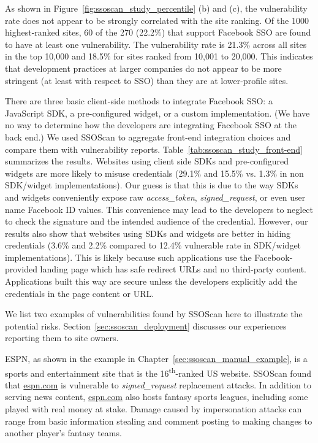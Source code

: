 As shown in Figure~\ref{fig:ssoscan_study_percentile} (b) and (c), the vulnerability rate does not appear to be strongly correlated with the site ranking.  Of the 1000 highest-ranked sites, 60 of the 270 (22.2\%) that support Facebook SSO are found to have at least one vulnerability.  The vulnerability rate is 21.3\% across all sites in the top 10,000 and 18.5\% for sites ranked from 10,001 to 20,000.  This indicates that development practices at larger companies do not appear to be more stringent (at least with respect to SSO) than they are at lower-profile sites.

 There are three basic client-side methods to integrate Facebook SSO: a JavaScript SDK, a pre-configured widget, or a custom implementation.  (We have no way to determine how the developers are integrating Facebook SSO at the back end.)  We used SSOScan to aggregate front-end integration choices and compare them with vulnerability reports.  Table~\ref{tab:ssoscan_study_front-end} summarizes the results.  Websites using client side SDKs and pre-configured widgets are more likely to misuse credentials (29.1\% and 15.5\% vs. 1.3\% in non SDK/widget implementations).  Our guess is that this is due to the way SDKs and widgets conveniently expose raw \emph{access\_token}, \emph{signed\_request}, or even user name Facebook ID values.  This convenience may lead to the developers to neglect to check the signature and the intended audience of the credential.  However, our results also show that websites using SDKs and widgets are better in hiding credentials (3.6\% and 2.2\% compared to 12.4\% vulnerable rate in SDK/widget implementations).  This is likely because such applications use the Facebook-provided landing page which has safe redirect URLs and no third-party content.  Applications built this way are secure unless the developers explicitly add the credentials in the page content or URL.



 We list two examples of vulnerabilities found by SSOScan here to illustrate the potential risks.  Section~\ref{sec:ssoscan_deployment} discusses our experiences reporting them to site owners.

 ESPN, as shown in the example in Chapter~\ref{sec:ssoscan_manual_example}, is a sports and entertainment site that is the 16\textsuperscript{th}-ranked US website.  SSOScan found that \url{espn.com} is vulnerable to \emph{signed\_request} replacement attacks.  In addition to serving news content, \url{espn.com} also hosts fantasy sports leagues, including some played with real money at stake.  Damage caused by impersonation attacks can range from basic information stealing and comment posting to making changes to another player's fantasy teams.

